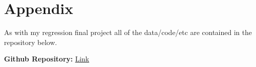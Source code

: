 \section*{Appendix}

As with my regression final project all of the data/code/etc are contained in the repository below. 

\noindent\textbf{Github Repository:} \href{https://github.com/blamson/cu_spring_2025/tree/main/math_7393/final_project}{Link}